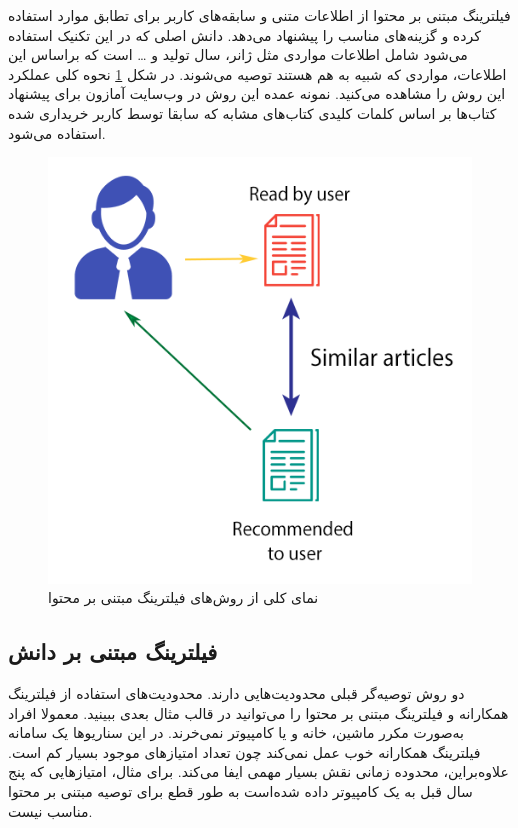 فیلترینگ مبتنی بر محتوا
از اطلاعات متنی و سابقه‌های کاربر برای تطابق موارد استفاده کرده و گزینه‌های مناسب را پیشنهاد می‌دهد. دانش اصلی‌ که در این تکنیک استفاده می‌شود شامل اطلاعات مواردی مثل ژانر، سال تولید و …  است که براساس این اطلاعات، مواردی که شبیه به هم هستند توصیه می‌شوند. در شکل 
\ref{recom4}
نحوه کلی عملکرد این روش را مشاهده می‌کنید. نمونه عمده این روش در وب‌سایت آمازون برای پیشنهاد کتاب‌ها بر اساس کلمات کلیدی کتاب‌های مشابه که سابقا توسط کاربر خریداری شده استفاده می‌شود.
\begin{figure}
	\centering
	\includegraphics[scale=0.5]{section2/recom4.png}
	\caption{نمای کلی از روش‌های فیلترینگ مبتنی بر محتوا}
	\label{recom4}
\end{figure}
\par
\subsection{فیلترینگ مبتنی بر دانش}
دو روش توصیه‌گر قبلی محدودیت‌هایی دارند. محدودیت‌های استفاده از فیلترینگ همکارانه و فیلترینگ مبتنی بر محتوا را می‌توانید در قالب مثال بعدی ببینید. معمولا افراد به‌صورت مکرر ماشین، خانه و یا کامپیوتر نمی‌خرند. در این سناریوها یک سامانه فیلترینگ همکارانه خوب عمل نمی‌کند چون تعداد امتیازهای موجود بسیار کم است. علاوه‌بر‌این، محدوده زمانی نقش بسیار مهمی ایفا می‌کند. برای مثال، امتیازهایی که پنج سال قبل به یک کامپیوتر داده شده‌است به طور قطع برای توصیه مبتنی بر محتوا مناسب نیست.

